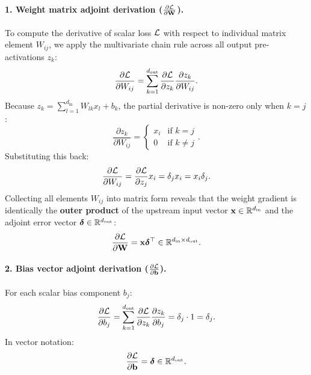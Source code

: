 \documentclass[../../main.tex]{subfiles}
\begin{document}
\paragraph{1. Weight matrix adjoint derivation ($\frac{\partial \mathcal{L}}{\partial \mathbf{W}}$).}
To compute the derivative of scalar loss $\mathcal{L}$ with respect to individual matrix element $W_{ij}$, we apply the multivariate chain rule across all output pre-activations $z_k$:
\begin{equation}
\frac{\partial \mathcal{L}}{\partial W_{ij}} = \sum_{k=1}^{d_{\text{out}}} \frac{\partial \mathcal{L}}{\partial z_k} \frac{\partial z_k}{\partial W_{ij}}.
\end{equation}
Because $z_k = \sum_{l=1}^{d_{\text{in}}} W_{lk} x_l + b_k$, the partial derivative is non-zero only when $k = j$:
\begin{equation}
\frac{\partial z_k}{\partial W_{ij}} = \begin{cases} x_i & \text{if } k = j \\ 0 & \text{if } k \ne j \end{cases}.
\end{equation}
Substituting this back:
\begin{equation}
\frac{\partial \mathcal{L}}{\partial W_{ij}} = \frac{\partial \mathcal{L}}{\partial z_j} x_i = \delta_j x_i = x_i \delta_j.
\end{equation}
Collecting all elements $W_{ij}$ into matrix form reveals that the weight gradient is identically the \textbf{outer product} of the upstream input vector $\mathbf{x} \in \mathbb{R}^{d_{\text{in}}}$ and the adjoint error vector $\bm{\delta} \in \mathbb{R}^{d_{\text{out}}}$:
\begin{equation}
\label{eq:weight_matrix_gradient}
\frac{\partial \mathcal{L}}{\partial \mathbf{W}} = \mathbf{x} \bm{\delta}^\top \in \mathbb{R}^{d_{\text{in}} \times d_{\text{out}}}.
\end{equation}

\paragraph{2. Bias vector adjoint derivation ($\frac{\partial \mathcal{L}}{\partial \mathbf{b}}$).}
For each scalar bias component $b_j$:
\begin{equation}
\frac{\partial \mathcal{L}}{\partial b_j} = \sum_{k=1}^{d_{\text{out}}} \frac{\partial \mathcal{L}}{\partial z_k} \frac{\partial z_k}{\partial b_j} = \delta_j \cdot 1 = \delta_j.
\end{equation}
In vector notation:
\begin{equation}
\label{eq:bias_vector_gradient}
\frac{\partial \mathcal{L}}{\partial \mathbf{b}} = \bm{\delta} \in \mathbb{R}^{d_{\text{out}}}.
\end{equation}
\end{document}
